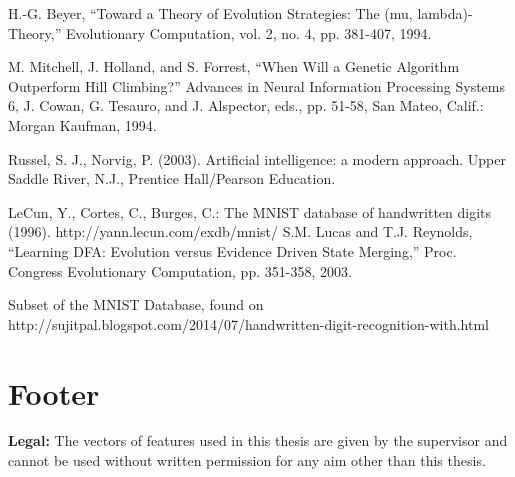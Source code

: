 \documentclass{mini}
\begin{document}
\begin{thebibliography}{1}
     H.-G. Beyer, “Toward a Theory of Evolution Strategies: The (mu, lambda)-Theory,” Evolutionary Computation, vol. 2, no. 4, pp. 381-407, 1994.
    
     M. Mitchell, J. Holland, and S. Forrest, “When Will a Genetic Algorithm Outperform Hill Climbing?” Advances in Neural Information Processing Systems 6, J. Cowan, G. Tesauro, and J. Alspector,
    eds., pp. 51-58, San Mateo, Calif.: Morgan Kaufman, 1994.
    
     Russel, S. J., Norvig, P. (2003). Artificial intelligence: a modern approach. Upper Saddle River, N.J., Prentice Hall/Pearson Education.
    
    LeCun, Y., Cortes, C., Burges, C.: The MNIST database of handwritten digits (1996). http://yann.lecun.com/exdb/mnist/
    S.M. Lucas and T.J. Reynolds, “Learning DFA: Evolution versus Evidence Driven State Merging,” Proc. Congress Evolutionary Computation, pp. 351-358, 2003.
    
     Subset of the MNIST Database, found on http://sujitpal.blogspot.com/2014/07/handwritten-digit-recognition-with.html

\end{thebibliography}



\newpage
\chapter*{Footer}
{\bf Legal:} The vectors of features used in this thesis are given by the supervisor and cannot be used without written permission for any aim other than this thesis.
\newpage


\makestatement
\end{document}
